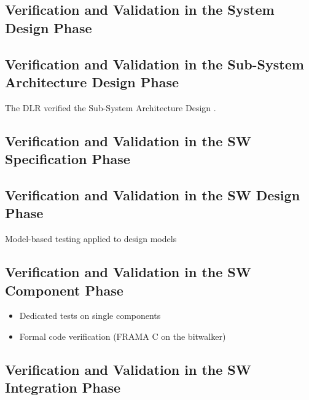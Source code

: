\documentclass{template/openetcs_article}
\begin{document}
\subsection{Verification and Validation in the System Design Phase}
\label{sec:vnv-1}






\subsection{Verification and Validation in the Sub-System Architecture Design Phase}
\label{sec:vnv-2}

The DLR verified the Sub-System Architecture Design
. 

\subsection{Verification and Validation in the SW Specification Phase}
\label{sec:vnv-3}




\subsection{Verification and Validation in the SW Design Phase}
\label{sec:vnv-4}

Model-based testing applied to design models  




\subsection{Verification and Validation in the SW Component Phase}
\label{sec:vnv-5}

\begin{itemize}
\item Dedicated tests on single components 
\item Formal code verification (FRAMA C on the bitwalker)
\end{itemize}


\subsection{Verification and Validation in the SW Integration Phase}
\label{sec:vnv-6}
\end{document}
